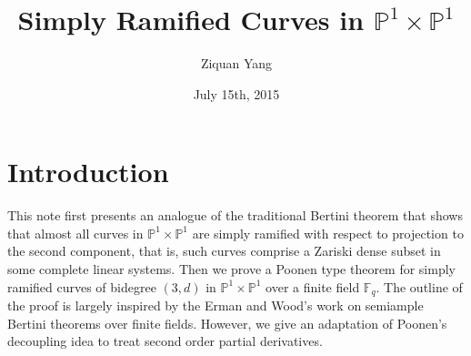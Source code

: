 \documentclass[12pt]{article}
\theoremstyle{plain}
\theoremstyle{definition}
\newcommand{\IF}{\mathbb{F}}
\newcommand{\IP}{\mathbb{P}}
\newcommand{\<}{\langle}
\renewcommand{\>}{\rangle}
\begin{document}
%

\title{Simply Ramified Curves in $\IP^1 \times \IP^1$}
\author{Ziquan Yang}


\date{July 15th, 2015}

\maketitle

 

\setcounter{section}{0}
\section{Introduction}
This note first presents an analogue of the traditional Bertini theorem that shows that almost all curves in $\IP^1 \times \IP^1$ are simply ramified with respect to projection to the second component, that is, such curves comprise a Zariski dense subset in some complete linear systems. Then we prove a Poonen type theorem for simply ramified curves of bidegree $(3, d)$ in $\IP^1 \times \IP^1$ over a finite field $\IF_q$. The outline of the proof is largely inspired by the Erman and Wood's work on semiample Bertini theorems over finite fields. However, we give an adaptation of Poonen's decoupling idea to treat second order partial derivatives.  
\end{document}
